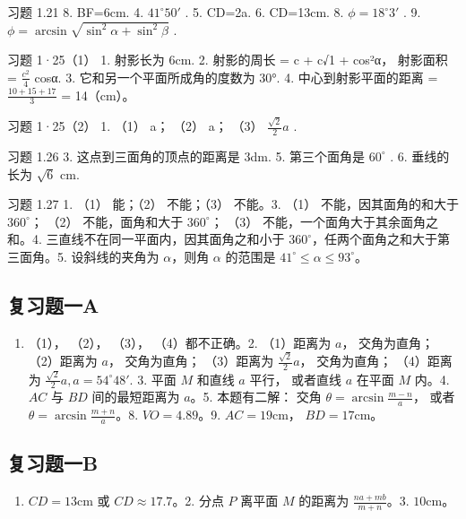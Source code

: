 习题 1.21 8. BF=6cm. 4. \(41^{\circ}50'\) . 5. CD=2a. 6. CD=13cm. 8.
\(\phi=18^{\circ}3'\) . 9.
\(\phi=\arcsin\sqrt{\sin^{2}\alpha+\sin^{2}\beta}\) .

习题 1·25（1） 1. 射影长为 6cm. 2. 射影的周长 = c + c√1 + cos²α，
射影面积 = \(\frac{c^2}{4}\) cosα. 3. 它和另一个平面所成角的度数为 30°.
4. 中心到射影平面的距离 = \(\frac{10 + 15 + 17}{3}\) = 14（cm）。

习题 1·25（2） 1. （1） a； （2） a； （3） \(\frac{\sqrt{2}}{2}a\) .

习题 1.26 3. 这点到三面角的顶点的距离是 3dm. 5. 第三个面角是
\(60^{\circ}\) . 6. 垂线的长为 \(\sqrt{6}\) cm.

习题 1.27 1. （1） 能；（2） 不能；（3） 不能。3. （1）
不能，因其面角的和大于 \(360^{\circ}\)； （2） 不能，面角和大于
\(360^{\circ}\)； （3） 不能，一个面角大于其余面角之和。4.
三直线不在同一平面内，因其面角之和小于
\(360^{\circ}\)，任两个面角之和大于第三面角。5. 设斜线的夹角为
\(\alpha\)，则角 \(\alpha\) 的范围是
\(41^{\circ} \leqslant \alpha \leqslant 93^{\circ}\)。

\subsection{复习题一A}

\begin{enumerate}
\item
  （1）， （2）， （3）， （4）都不正确。2. （1）距离为 \(a\)，
  交角为直角； （2）距离为 \(a\)， 交角为直角； （3）距离为
  \(\frac{\sqrt{2}}{2} a\)， 交角为直角； （4）距离为
  \(\frac{\sqrt{2}}{2} a, a = 54^{\circ}48'\). 3. 平面 \(M\) 和直线
  \(a\) 平行， 或者直线 \(a\) 在平面 \(M\) 内。4. \(AC\) 与 \(BD\)
  间的最短距离为 \(a\)。5. 本题有二解： 交角
  \(\theta = \arcsin \frac{m - n}{a}\)， 或者
  \(\theta = \arcsin \frac{m + n}{a}\)。8. \(VO = 4.89\)。9.
  \(AC = 19\mathrm{cm}\)， \(BD = 17\mathrm{cm}\)。
\end{enumerate}

\subsection{复习题一B}

\begin{enumerate}
\item
  \(CD = 13\mathrm{cm}\) 或 \(CD \approx 17.7\)。2. 分点 \(P\) 离平面
  \(M\) 的距离为 \(\frac{na + mb}{m + n}\)。3. \(10\mathrm{cm}\)。
\end{enumerate}

